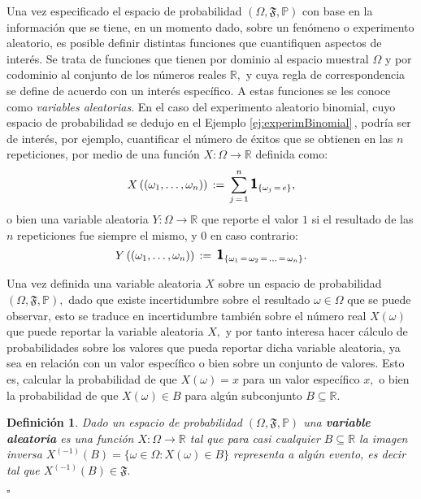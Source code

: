 \documentclass[spanish,10pt,letterpaper]{article}
\newtheorem{defi}{Definición}
\newcommand{\prob}{\mathbb{P}}
\newcommand{\Runo}{\mathbb{R}}
\newcommand{\indic}{\textbf{\textsf{\large{1}}}}
\newcommand{\qed}{\begin{flushright}$\square$\end{flushright}}
\begin{document}
	Una vez especificado el espacio de probabilidad $(\Omega,\mathfrak{F},\prob)$ con base en la información que se tiene, en un momento dado, sobre un fenómeno o experimento aleatorio, es posible definir distintas funciones que cuantifiquen aspectos de interés. Se trata de funciones que tienen por dominio al espacio muestral $\Omega$ y por codominio al conjunto de los números reales $\Runo,$ y cuya regla de correspondencia se define de acuerdo con un interés específico. A estas funciones se les conoce como \textit{variables aleatorias}. En el caso del experimento aleatorio binomial, cuyo espacio de probabilidad se dedujo en el Ejemplo \ref{ej:experimBinomial}\,, podría ser de interés, por ejemplo, cuantificar el número de éxitos que se obtienen en las $n$ repeticiones, por medio de una función $X:\Omega\rightarrow\Runo$ definida como:
	\begin{equation}\label{def:vaBinomial}
		X\left((\omega_1,\ldots,\omega_n)\right) \,:=\, \sum_{j\,=\,1}^n\indic_{\{\omega_j\,=\,e\}},
	\end{equation}
	o bien una variable aleatoria $Y:\Omega\rightarrow\Runo$ que reporte el valor $1$ si el resultado de las $n$ repeticiones fue siempre el mismo, y $0$ en caso contrario:
	\begin{equation}\label{def:vaBinomial2}
		Y\left((\omega_1,\ldots,\omega_n)\right) \,:=\, \indic_{\{\omega_1\,=\,\omega_2\,=\,\ldots\,=\,\omega_n\}}.
	\end{equation}
	
	\medskip 
	
	Una vez definida una variable aleatoria $X$ sobre un espacio de probabilidad $(\Omega,\mathfrak{F},\prob),$ dado que existe incertidumbre sobre el resultado $\omega\in\Omega$ que se puede observar, esto se traduce en incertidumbre también sobre el número real $X(\omega)$ que puede reportar la variable aleatoria $X,$ y por tanto interesa hacer cálculo de probabilidades sobre los valores que pueda reportar dicha variable aleatoria, ya sea en relación con un valor específico o bien sobre un conjunto de valores. Esto es, calcular la probabilidad de que $X(\omega)=x$ para un valor específico $x,$ o bien la probabilidad de que $X(\omega)\in B$ para algún subconjunto $B\subseteq\Runo.$ 
	
	\bigskip 
	
	\begin{defi}\label{def:variablealeat}
		Dado un espacio de probabilidad $(\Omega,\mathfrak{F},\prob)$ una \textbf{variable aleatoria} es una función $X:\Omega\rightarrow\Runo$ tal que para casi cualquier  $B\subseteq\Runo$ la imagen inversa $X^{(-1)}(B)=\{\omega\in\Omega:X(\omega)\in B\}$ representa a algún evento, es decir tal que $X^{(-1)}(B)\in\mathfrak{F}.$ \qed 
	\end{defi}
	
\end{document}
